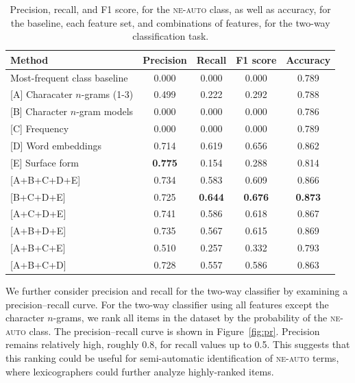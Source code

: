 \documentclass[10pt, a4paper]{article}
\newcommand{\figref}[2][]{Figure~\ref{#2}#1\xspace}
\begin{document}
\begin{table}
\begin{center}
\begin{tabular}{lcccc}

\textbf{Method}& \textbf{Precision}&\textbf{Recall}
&\textbf{F1 score}&\textbf{Accuracy}\\
 \hline
Most-frequent class baseline & 0.000 & 0.000  & 0.000 & 0.789 \\

\hline

[A] Characater $n$-grams (1-3) & 0.499 & 0.222 & 0.292 & 0.788 \\

[B] Character $n$-gram models &  0.000 & 0.000 & 0.000 & 0.786 \\

[C] Frequency & 0.000 & 0.000 & 0.000 & 0.789 \\

[D] Word embeddings & 0.714 & 0.619 & 0.656 & 0.862 \\

[E] Surface form & \textbf{0.775} & 0.154 & 0.288 & 0.814 \\ 

[A+B+C+D+E] & 0.734 & 0.583 & 0.609 & 0.866 \\

[B+C+D+E] & 0.725 & \textbf{0.644} & \textbf{0.676} &  \textbf{0.873} \\

[A+C+D+E] & 0.741 & 0.586 & 0.618 & 0.867 \\

[A+B+D+E] & 0.735 & 0.567 & 0.615 & 0.869 \\

[A+B+C+E] & 0.510 & 0.257 & 0.332 & 0.793 \\

[A+B+C+D] & 0.728 & 0.557 & 0.586 & 0.863 \\
\end{tabular}
\caption{Precision, recall, and F1 score, for the \textsc{ne-auto}
  class, as well as accuracy, for the baseline, each feature set, and
  combinations of features, for the two-way classification
  task.\label{tbl:results2way}}
\end{center}
\end{table}

We further consider precision and recall for the two-way classifier by
examining a precision--recall curve. For the two-way classifier using
all features except the character $n$-grams, we rank all items in the
dataset by the probability of the \textsc{ne-auto} class. The
precision--recall curve is shown in \figref{fig:pr}. Precision remains
relatively high, roughly 0.8, for recall values up to 0.5. This
suggests that this ranking could be useful for semi-automatic
identification of \textsc{ne-auto} terms, where lexicographers could
further analyze highly-ranked items.
\end{document}
